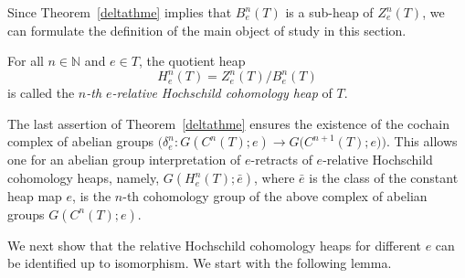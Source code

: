 \documentclass[pdftex]{sigma}
\numberwithin{equation}{section}
\newcommand{\N}{\mathbb N}
\begin{document}
Since Theorem~\ref{deltathme} implies that $B^n_e(T)$ is a sub-heap of $Z^n_e(T)$, we can formulate the definition of the main object of study in this section.
\begin{Definition}\label{quotient.def}
For all $n\in \N$ and $e\in T$, the quotient heap
\[ H^n_e(T) = Z^n_e(T)/B^n_e(T)
\]
is called the {\em $n$-th $e$-relative Hochschild cohomology heap} of $T$.
\end{Definition}

\begin{Remark}\label{rem.coh.gr}
 The last assertion of Theorem~\ref{deltathme} ensures the existence of the cochain complex of abelian groups $\big(\delta_e^n\colon G(C^n(T);e) \to G\big(C^{n+1}(T);e\big)\big)$. This allows one for an abelian group interpretation of $e$-retracts of $e$-relative Hochschild cohomology heaps, namely, $G(H^n_e(T);\bar{e})$, where $\bar{e}$ is the class of the constant heap map $e$, is the $n$-th cohomology group of the above complex of abelian groups $G(C^n(T);e)$.
\end{Remark}
We next show that the relative Hochschild cohomology heaps for different $e$ can be identified up to isomorphism. We start with the following lemma.
\end{document}
